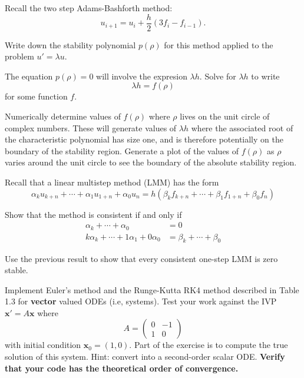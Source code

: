 \documentclass[minion]{homework}
\begin{document}
\begin{problems}

\problem Recall the two step Adams-Bashforth method:
\[
u_{i+1} = u_i + \frac{h}{2}(3f_i-f_{i-1}).
\]
\begin{subproblems}
	\item Write down the stability polynomial $p(\rho)$ for this method applied to the problem $u'=\lambda u$.
	\item The equation $p(\rho)=0$ will involve the expresion $\lambda h$.  Solve for $\lambda h$ to write
	\[
       \lambda h = f(\rho)
	\]
	for some function $f$.
	\item Numerically determine values of $f(\rho)$ where $\rho$ lives on the unit circle of complex numbers.  These will 
	generate values of
	$\lambda h$ where the associated root of the characteristic
	polynomial has size one, and is therefore potentially on the 
	boundary of the stability region. 
	Generate a plot of the values of $f(\rho)$ as $\rho$
	varies around the unit circle to see the boundary of the 
	absolute stability region.
\end{subproblems}

\problem Recall that a linear multistep method (LMM) has the form
\[
\alpha_{k} u_{k+n}+\cdots +\alpha_1 u_{1+n} + \alpha_0 u_n = h(
\beta_{k} f_{k+n}+\cdots +\beta_1 f_{1+n} + \beta_0 f_n
)
\]
\begin{subproblems}
\item Show that the method is consistent if and only if
\begin{equation}
\begin{aligned}
\alpha_{k}+\cdots+\alpha_0 &= 0\\
k\alpha_{k}+\cdots+ 1\alpha_1+0\alpha_0 &= \beta_k+\cdots+\beta_0
\end{aligned}
\end{equation}
\item Use the previous result to show that every consistent one-step LMM
is zero stable.
\end{subproblems}

\problem Implement Euler's method and the Runge-Kutta RK4 method 
described in Table 1.3 for \textbf{vector} valued ODEs (i.e, systems).
Test your work against the IVP $\mathbf x' = A\mathbf x$ where
\[
A = \begin{pmatrix} 0 & -1 \\ 1 & 0 \end{pmatrix}
\]
with initial condition $\mathbf x_0 = (1,0)$.  Part of the exercise
is to compute the true solution of this system.  Hint: convert into
a second-order scalar ODE. \textbf{Verify that your code has the theoretical
order of convergence.}


\end{problems}
\end{document}
